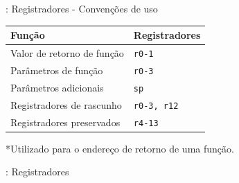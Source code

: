 \documentclass{beamer}
\begin{document}
\begin{darkframes}
\begin{frame}{\secname: Registradores - Convenções de uso}
\begin{center}
        \begin{tabular}{|l|l|}
            \hline
            Função & Registradores \\\hline
            Valor de retorno de função & \texttt{r0-1} \\
            Parâmetros de função & \texttt{r0-3} \\
            Parâmetros adicionais & \texttt{sp} \\
            Registradores de rascunho & \texttt{r0-3, r12} \\
            Registradores preservados & \texttt{r4-13} \\
            \hline
        \end{tabular}
    \end{center}

    *Utilizado para o endereço de retorno de uma função.
\end{frame}

\begin{frame}{\secname: Registradores}
\end{frame}
\end{darkframes}
\end{document}
